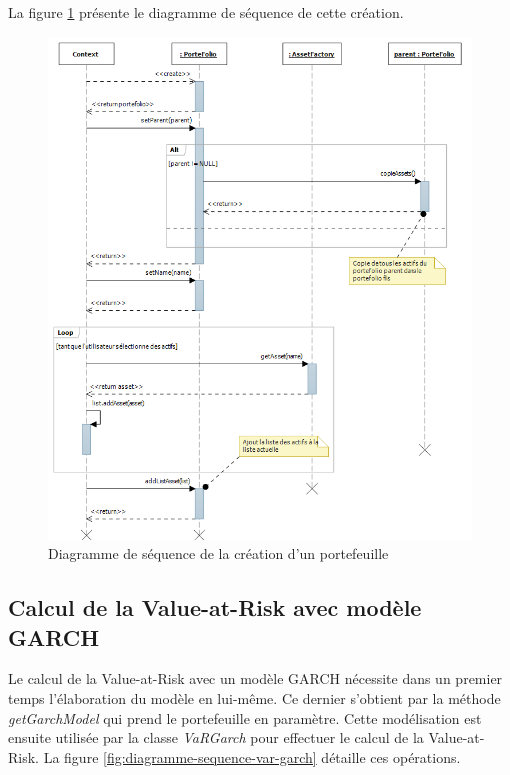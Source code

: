 \documentclass[a4paper,titlepage,french]{report}
\begin{document}
La figure \ref{fig:diagramme-sequence-creation-portefeuille} présente le diagramme de séquence de cette création.

\begin{figure}
  	\center
  	\includegraphics[width=1\textwidth]{diagSeqPortfolio.png}
  	\caption{Diagramme de séquence de la création d'un portefeuille}
    \label{fig:diagramme-sequence-creation-portefeuille}
\end{figure}


\subsection{Calcul de la Value-at-Risk avec modèle GARCH}

Le calcul de la Value-at-Risk avec un modèle GARCH nécessite dans un premier temps l'élaboration du modèle en lui-même.
Ce dernier s'obtient par la méthode \textit{getGarchModel} qui prend le portefeuille en paramètre.
Cette modélisation est ensuite utilisée par la classe \textit{VaRGarch} pour effectuer le calcul de la Value-at-Risk.
La figure \ref{fig:diagramme-sequence-var-garch} détaille ces opérations.
\end{document}
